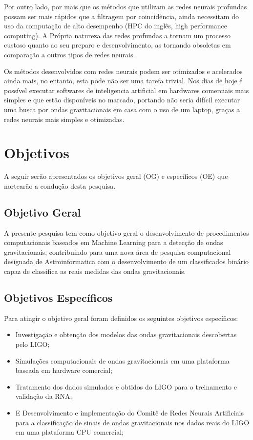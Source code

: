 Por outro lado, por mais que os métodos que utilizam as redes neurais profundas possam ser mais rápidos que a filtragem por coincidência, ainda necessitam do uso da computação de alto desempenho (HPC do inglês, high performance computing). A Própria natureza das redes profundas a tornam um processo custoso quanto ao seu preparo e desenvolvimento, as tornando obsoletas em comparação a outros tipos de redes neurais.

Os métodos desenvolvidos com redes neurais podem ser otimizados e acelerados ainda mais, no entanto, esta pode não ser uma tarefa trivial. Nos dias de hoje é possível executar softwares de inteligencia artificial em hardwares comerciais mais simples e que estão disponíveis no marcado, portando não seria difícil executar uma busca por ondas gravitacionais em casa com o uso de um laptop, graças a redes neurais mais simples e otimizadas.

\section{Objetivos}
A seguir serão apresentados os objetivos geral (OG) e específicos (OE) que nortearão a condução desta pesquisa.

\subsection{Objetivo Geral}

A presente pesquisa tem como objetivo geral o desenvolvimento de procedimentos computacionais baseados em Machine Learning para a detecção de ondas gravitacionais, contribuindo para uma nova área de pesquisa computacional designada de Astroinformatica com o desenvolvimento de um classificados binário capaz de classifica as reais medidas das ondas gravitacionais.

\subsection{Objetivos Específicos}
Para atingir o objetivo geral foram definidos os seguintes objetivos específicos: 
\begin{itemize}

\item Investigação e obtenção dos modelos das ondas gravitacionais descobertas pelo LIGO;
\item Simulações computacionais de ondas gravitacionais em uma plataforma baseada em hardware comercial;
\item Tratamento dos dados simulados e obtidos do LIGO para o treinamento e validação da RNA;
\item E Desenvolvimento e implementação do Comitê de Redes Neurais Artificiais para a classificação de sinais de ondas gravitacionais nos dados reais do LIGO em uma plataforma CPU comercial;

\end{itemize}
